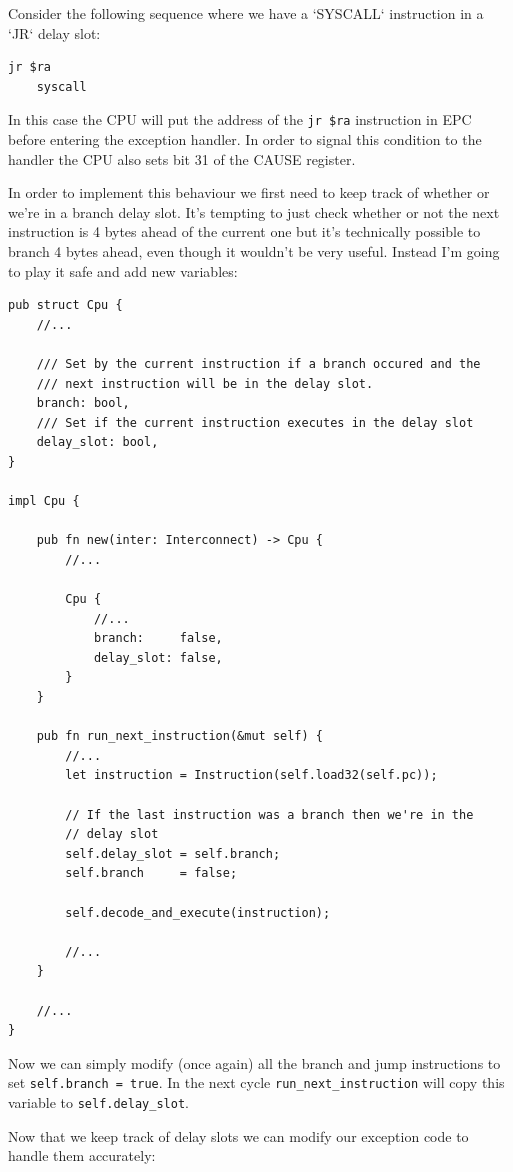 \documentclass[a4paper]{article}
\newcommand{\code}[1] {\texttt{#1}}
\begin{document}
Consider the following sequence where we have a `SYSCALL` instruction
in a `JR` delay slot:

\begin{lstlisting}[language=assembly]
    jr $ra
    syscall
\end{lstlisting}

In this case the CPU will put the address of the \code{jr \$ra}
instruction in EPC before entering the exception handler. In order to
signal this condition to the handler the CPU also sets bit 31 of the
CAUSE register.

In order to implement this behaviour we first need to keep track of
whether or we're in a branch delay slot. It's tempting to just check
whether or not the next instruction is 4 bytes ahead of the current
one but it's technically possible to branch 4 bytes ahead, even though
it wouldn't be very useful. Instead I'm going to play it safe and add
new variables:

\begin{lstlisting}
pub struct Cpu {
    //...

    /// Set by the current instruction if a branch occured and the
    /// next instruction will be in the delay slot.
    branch: bool,
    /// Set if the current instruction executes in the delay slot
    delay_slot: bool,
}

impl Cpu {

    pub fn new(inter: Interconnect) -> Cpu {
        //...

        Cpu {
            //...
            branch:     false,
            delay_slot: false,
        }
    }

    pub fn run_next_instruction(&mut self) {
        //...
        let instruction = Instruction(self.load32(self.pc));

        // If the last instruction was a branch then we're in the
        // delay slot
        self.delay_slot = self.branch;
        self.branch     = false;

        self.decode_and_execute(instruction);

        //...
    }

    //...
}
\end{lstlisting}

Now we can simply modify (once again) all the branch and jump
instructions to set \code{self.branch = true}. In the next cycle
\code{run\_next\_instruction} will copy this variable to
\code{self.delay\_slot}.

Now that we keep track of delay slots we can modify our exception code
to handle them accurately:
\end{document}
